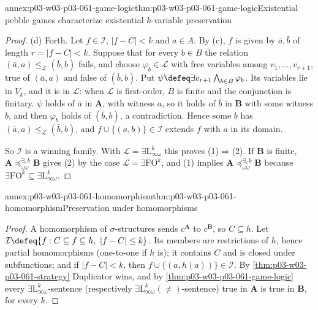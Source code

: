 \begin{annexitem}{annex:p03-w03-p03-061-game-logic}{thm:p03-w03-p03-061-game-logic}{Existential pebble games characterize existential \(k\)-variable preservation}
\begin{proof}
(d) Forth. Let \(f\in\mathcal I\), \(|f-C|<k\) and \(a\in A\). By (c),
\(f\) is given by \(\bar a,\bar b\) of length \(r=|f-C|<k\). Suppose that
for every \(b\in B\) the relation \((\bar a,a)\le_{\mathcal L}(\bar b,b)\)
fails, and choose \(\varphi_b\in\mathcal L\) with free variables among
\(v_1,\ldots,v_{r+1}\), true of \((\bar a,a)\) and false of \((\bar b,b)\).
Put \(\psi\defeq\exists v_{r+1}\bigwedge_{b\in B}\varphi_b\). Its variables
lie in \(V_k\), and it is in \(\mathcal L\): when \(\mathcal L\) is
first-order, \(B\) is finite and the conjunction is finitary. \(\psi\) holds
of \(\bar a\) in \(\mathbf A\), with witness \(a\), so it holds of \(\bar b\)
in \(\mathbf B\) with some witness \(b\), and then \(\varphi_b\) holds of
\((\bar b,b)\), a contradiction. Hence some \(b\) has
\((\bar a,a)\le_{\mathcal L}(\bar b,b)\), and
\(f\cup\{(a,b)\}\in\mathcal I\) extends \(f\) with \(a\) in its domain.

So \(\mathcal I\) is a winning family. With \(\mathcal L=\exists\mathrm
L^k_{\infty\omega}\) this proves (1)\(\Rightarrow\)(2). If \(\mathbf B\) is
finite, \(\mathbf A\preceq^{\exists,k}_{\omega\omega}\mathbf B\) gives (2) by
the case \(\mathcal L=\exists\mathrm{FO}^k\), and (1) implies
\(\mathbf A\preceq^{\exists,k}_{\omega\omega}\mathbf B\) because
\(\exists\mathrm{FO}^k\subseteq\exists\mathrm L^k_{\infty\omega}\).
\end{proof}
\end{annexitem}

\begin{annexitem}{annex:p03-w03-p03-061-homomorphism}{thm:p03-w03-p03-061-homomorphism}{Preservation under homomorphisms}
\begin{proof}
A homomorphism of \(\sigma\)-structures sends \(c^{\mathbf A}\) to
\(c^{\mathbf B}\), so \(C\subseteq h\). Let \(\mathcal I\defeq\{f:C\subseteq
f\subseteq h,\ |f-C|\le k\}\). Its members are restrictions of \(h\), hence
partial homomorphisms (one-to-one if \(h\) is); it contains \(C\) and is
closed under subfunctions; and if \(|f-C|<k\), then
\(f\cup\{(a,h(a))\}\in\mathcal I\). By \cref{thm:p03-w03-p03-061-strategy}
Duplicator wins, and by \cref{thm:p03-w03-p03-061-game-logic} every
\(\exists\mathrm L^k_{\infty\omega}\)-sentence (respectively
\(\exists\mathrm L^k_{\infty\omega}(\neq)\)-sentence) true in \(\mathbf A\) is
true in \(\mathbf B\), for every \(k\).
\end{proof}
\end{annexitem}

